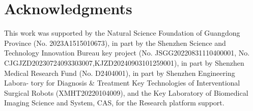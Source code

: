 \section{Acknowledgments}
This work was supported by the Natural Science Foundation
of Guangdong Province (No. 2023A1515010673), in part
by the Shenzhen Science and Technology Innovation
Bureau key project (No. JSGG20220831110400001, No.
CJGJZD20230724093303007,KJZD20240903101259001),
in part by Shenzhen Medical Research Fund (No.
D2404001), in part by Shenzhen Engineering Labora-
tory for Diagnosis \& Treatment Key Technologies of
Interventional Surgical Robots (XMHT20220104009), and
the Key Laboratory of Biomedical Imaging Science and
System, CAS, for the Research platform support.